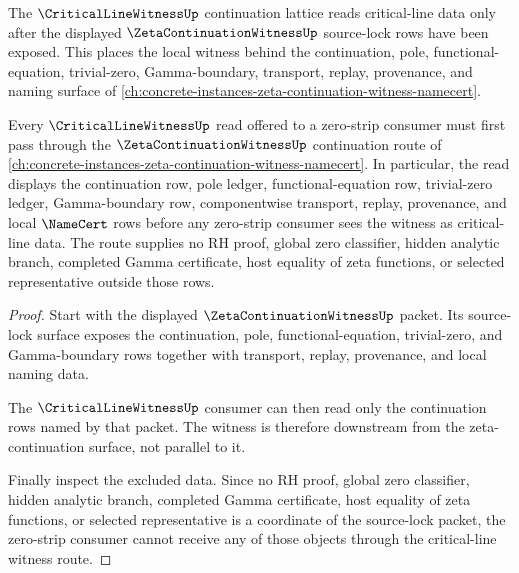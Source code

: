 The $\CriticalLineWitnessUp$ continuation lattice reads critical-line data only after the displayed $\ZetaContinuationWitnessUp$ source-lock rows have been exposed. This places the local witness behind the continuation, pole, functional-equation, trivial-zero, Gamma-boundary, transport, replay, provenance, and naming surface of \autoref{ch:concrete-instances-zeta-continuation-witness-namecert}.

\begin{theorem}
\label{thm:critical-line-witness-zeta-continuation-route}
Every $\CriticalLineWitnessUp$ read offered to a zero-strip consumer must first pass through the $\ZetaContinuationWitnessUp$ continuation route of \autoref{ch:concrete-instances-zeta-continuation-witness-namecert}. In particular, the read displays the continuation row, pole ledger, functional-equation row, trivial-zero ledger, Gamma-boundary row, componentwise transport, replay, provenance, and local $\NameCert$ rows before any zero-strip consumer sees the witness as critical-line data. The route supplies no RH proof, global zero classifier, hidden analytic branch, completed Gamma certificate, host equality of zeta functions, or selected representative outside those rows.
\end{theorem}
\begin{proof}
Start with the displayed $\ZetaContinuationWitnessUp$ packet. Its source-lock surface exposes the continuation, pole, functional-equation, trivial-zero, and Gamma-boundary rows together with transport, replay, provenance, and local naming data.

The $\CriticalLineWitnessUp$ consumer can then read only the continuation rows named by that packet. The witness is therefore downstream from the zeta-continuation surface, not parallel to it.

Finally inspect the excluded data. Since no RH proof, global zero classifier, hidden analytic branch, completed Gamma certificate, host equality of zeta functions, or selected representative is a coordinate of the source-lock packet, the zero-strip consumer cannot receive any of those objects through the critical-line witness route.
\end{proof}
